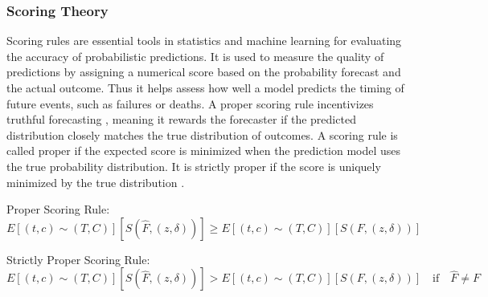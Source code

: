 \subsubsection{Scoring Theory}
\par \noindent Scoring rules are essential tools in statistics and machine learning for evaluating the accuracy of probabilistic predictions. \parencite{yanagisawa_proper_2023} It is used to measure the quality of predictions by assigning a numerical score based on the probability forecast and the actual outcome. Thus it helps assess how well a model predicts the timing of future events, such as failures or deaths. A proper scoring rule incentivizes truthful forecasting \parencite{yanagisawa_proper_2023}, meaning it rewards the forecaster if the predicted distribution closely matches the true distribution of outcomes. A scoring rule is called proper \parencite{yanagisawa_proper_2023} if the expected score is minimized when the prediction model uses the true probability distribution. It is strictly proper if the score is uniquely minimized by the true distribution \parencite{yanagisawa_proper_2023}.

\noindent Proper Scoring Rule:
\begin{equation} \label{eq:proper}
E[(t,c) \sim (T,C)][S(\hat{F}, (z, \delta))] \geq E[(t,c) \sim (T,C)][S(F, (z, \delta))]
\end{equation}

\noindent Strictly Proper Scoring Rule:
\begin{equation} \label{eq:strictproper}
E[(t,c) \sim (T,C)][S(\hat{F}, (z, \delta))] > E[(t,c) \sim (T,C)][S(F, (z, \delta))] \quad \text{if} \quad \hat{F} \neq F
\end{equation}




